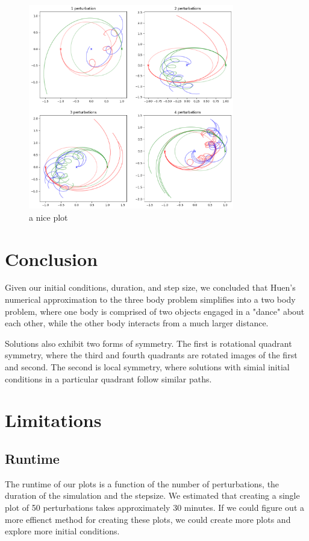 \documentclass{article}
\begin{document}
\begin{figure}[h!]
    \centering
    \includegraphics[width=0.8\textwidth]{Images/perterbations1to4.png}
    \caption{a nice plot}
    \label{fig:mesh3}
\end{figure}



\section{Conclusion}
Given our initial conditions, duration, and step size, we concluded that Huen's numerical approximation to the three body problem simplifies into a two body problem, where one body is comprised of two objects engaged in a "dance" about each other, while the other body interacts from a much larger distance.

Solutions also exhibit two forms of symmetry. The first is rotational quadrant symmetry, where the third and fourth quadrants are rotated images of the first and second. The second is local symmetry, where solutions with simial initial conditions in a particular quadrant follow similar paths.

\section{Limitations}
\subsection{Runtime}
The runtime of our plots is a function of the number of perturbations, the duration of the simulation and the stepsize. We estimated that creating a single plot of 50 perturbations takes approximately 30 minutes. If we could figure out a more effienct method for creating these plots, we could create more plots and explore more initial conditions.
\end{document}
